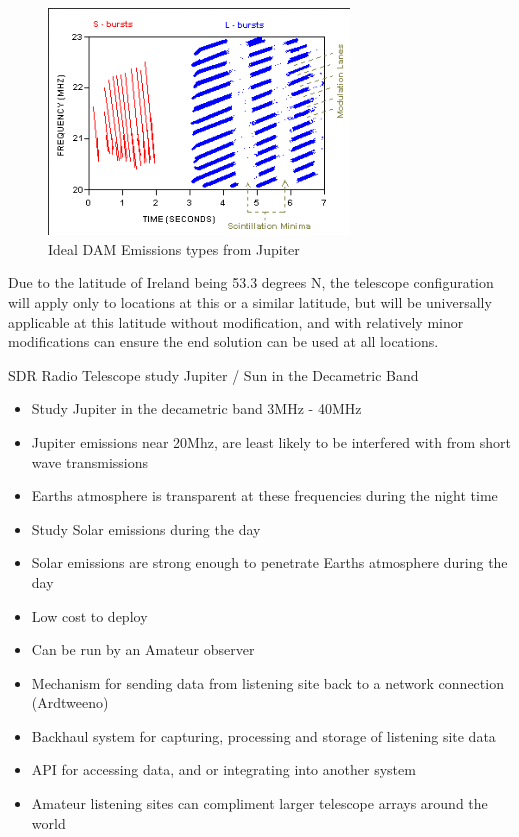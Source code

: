 \documentclass[runningheads,a4paper]{llncs}
\begin{document}
%
\begin{figure}[here]
\centering
\includegraphics[width=8cm]{images/05}
\caption{Ideal DAM Emissions types from Jupiter \citep{wilkinson94}}
\label{fig:dam_emissions_spectrum}
\end{figure}
%

Due to the latitude of Ireland being 53.3 degrees N, the telescope configuration will apply only to locations at this or a similar latitude, but will be universally applicable at this latitude without modification, and with relatively minor modifications can ensure the end solution can be used at all locations.


SDR Radio Telescope study Jupiter / Sun in the Decametric Band

\begin{itemize}
  \item Study Jupiter in the decametric band 3MHz - 40MHz
  \item Jupiter emissions near 20Mhz, are least likely to be interfered with from short wave transmissions
  \item Earths atmosphere is transparent at these frequencies during the night time
  \item Study Solar emissions during the day
  \item Solar emissions are strong enough to penetrate Earths atmosphere during the day
\end{itemize}


\begin{itemize}
  \item Low cost to deploy
  \item Can be run by an Amateur observer
  \item Mechanism for sending data from listening site back to a network connection (Ardtweeno)
  \item Backhaul system for capturing, processing and storage of listening site data
  \item API for accessing data, and or integrating into another system
  \item Amateur listening sites can compliment larger telescope arrays around the world
\end{itemize}
\end{document}
